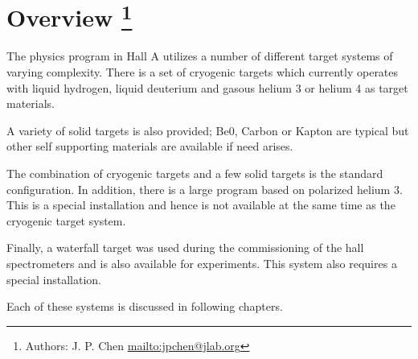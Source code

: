 \section[Overview]{ Overview
\footnote{Authors: J. P. Chen \url{mailto:jpchen@jlab.org}}
}

The physics program in Hall A utilizes a number of different
target systems of varying complexity. There is a set of
cryogenic targets which currently operates with liquid hydrogen, liquid
deuterium and gasous helium 3 or helium 4
as target materials.

A variety of solid targets is also provided; Be0, Carbon or
Kapton are typical but other self supporting materials are available if need arises.

The combination of cryogenic targets and a few solid targets is
the standard configuration. In addition,
there is a large program based on polarized helium 3. This
is a special installation and hence is not available at the same
time as the cryogenic target system.

Finally, a waterfall target was used during the commissioning of
the hall spectrometers and is also available for experiments. This system also 
requires a special installation.

Each of these systems is discussed in following chapters.
%
%
%
%

